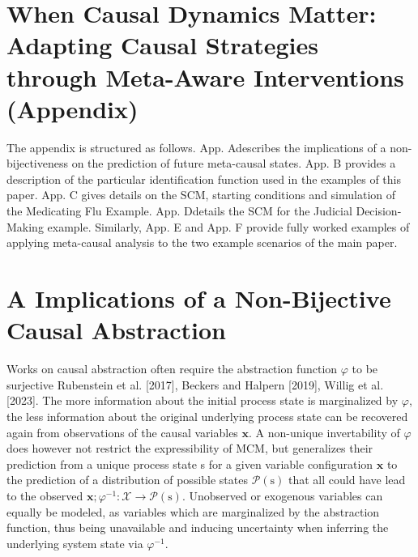 \documentclass[10pt]{article}
\begin{document}
\section*{When Causal Dynamics Matter: Adapting Causal Strategies through Meta-Aware Interventions (Appendix)}
The appendix is structured as follows. App. Adescribes the implications of a non-bijectiveness on the prediction of future meta-causal states. App. B provides a description of the particular identification function used in the examples of this paper. App. C gives details on the SCM, starting conditions and simulation of the Medicating Flu Example. App. Ddetails the SCM for the Judicial Decision-Making example. Similarly, App. E and App. F provide fully worked examples of applying meta-causal analysis to the two example scenarios of the main paper.

\section*{A Implications of a Non-Bijective Causal Abstraction}
Works on causal abstraction often require the abstraction function $\varphi$ to be surjective Rubenstein et al. [2017], Beckers and Halpern [2019], Willig et al. [2023]. The more information about the initial process state is marginalized by $\varphi$, the less information about the original underlying process state can be recovered again from observations of the causal variables $\mathbf{x}$. A non-unique invertability of $\varphi$ does however not restrict the expressibility of MCM, but generalizes their prediction from a unique process state s for a given variable configuration $\mathbf{x}$ to the prediction of a distribution of possible states $\mathcal{P}(\mathrm{s})$ that all could have lead to the observed $\mathbf{x} ; \varphi^{-1}: \mathcal{X} \rightarrow \mathcal{P}(\mathrm{s})$. Unobserved or exogenous variables can equally be modeled, as variables which are marginalized by the abstraction function, thus being unavailable and inducing uncertainty when inferring the underlying system state via $\varphi^{-1}$.
\end{document}
